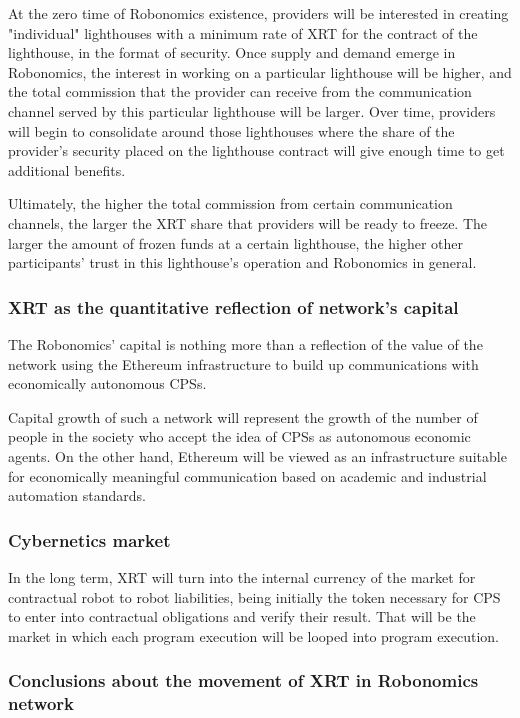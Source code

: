 \documentclass{article}
\begin{document}
At the zero time of Robonomics existence, providers will be interested in creating "individual" lighthouses with a minimum rate of XRT for the contract of the lighthouse, in the format of security. Once supply and demand emerge in Robonomics, the interest in working on a particular lighthouse will be higher, and the total commission that the provider can receive from the communication channel served by this particular lighthouse will be larger. Over time, providers will begin to consolidate around those lighthouses where the share of the provider's security placed on the lighthouse contract will give enough time to get additional benefits.
 
Ultimately, the higher the total commission from certain communication channels, the larger the XRT share that providers will be ready to freeze. The larger the amount of frozen funds at a certain lighthouse, the higher other participants’ trust in this lighthouse’s operation and Robonomics in general.

\subsubsection{XRT as the quantitative reflection of network’s capital}

The Robonomics’ capital is nothing more than a reflection of the value of the network using the Ethereum infrastructure to build up communications with economically autonomous CPSs.
 
Capital growth of such a network will represent the growth of the number of people in the society who accept the idea of CPSs as autonomous economic agents. On the other hand, Ethereum will be viewed as an infrastructure suitable for economically meaningful communication based on academic and industrial automation standards.

\subsubsection{Cybernetics market}

In the long term, XRT will turn into the internal currency of the market for contractual robot to robot liabilities, being initially the token necessary for CPS to enter into contractual obligations and verify their result. That will be the market in which each program execution will be looped into program execution.

\subsubsection{Conclusions about the movement of XRT in Robonomics network}
\end{document}

